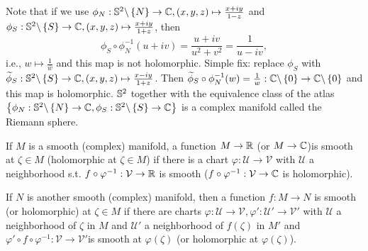 \begin{example}
\begin{enumerate}
  Note that if we use $\phi_N:\mathbb{S}^2 \backslash  \left\{N\right\} \to \mathbb{C},(x,y,z)\mapsto \frac{x+iy}{1-z}$ and $\phi_S:\mathbb{S}^2\backslash \left\{S\right\} \to \mathbb{C},(x,y,z)\mapsto \frac{x+iy}{1+z}$, then
  \[
    \phi_S\circ \phi_N^{-1}(u+iv)= \frac{u+iv}{u^2+v^2}=\frac{1}{u-iv},
  \] 
  i.e., $w\mapsto \frac{1}{\overline{w} }$ and this map is not holomorphic. Simple fix: replace $\phi_S$ with $\widetilde{\phi}_S:\mathbb{S}^2 \backslash \left\{S\right\} \to \mathbb{C}, (x,y,z)\mapsto \frac{x-iy}{1+z}$. Then $\widetilde{\phi}_S\circ \phi^{-1}_N(w)=\frac{1}{w}:\mathbb{C} \backslash \left\{0\right\} \to \mathbb{C}\backslash \left\{0\right\} $ and this map is holomorphic. $\mathbb{S}^2$ together with the equivalence class of the atlas $\left\{\phi_N:\mathbb{S}^2\backslash \left\{N\right\} \to \mathbb{C},\phi_S:\mathbb{S}^2\backslash \left\{S\right\} \to \mathbb{C}\right\} $ is a complex manifold called the Riemann sphere.
\end{enumerate}
\end{example}

\begin{definition}
  If $M$ is a smooth (complex) manifold, a function $M\to \mathbb{R}$ (or $M\to \mathbb{C}$)is smooth at $\zeta \in M$ (holomorphic at $\zeta \in M$) if there is a chart $\varphi:\mathcal{U}\to \mathcal{V}$ with $\mathcal{U}$ a neighborhood s.t. $f\circ \varphi^{-1}:\mathcal{V}\to \mathbb{R}$ is smooth ($f\circ \varphi^{-1}:\mathcal{V}\to \mathbb{C}$ is holomorphic). 

  If $N$ is another smooth (complex) manifold, then a function $f:M\to N$ is smooth (or holomorphic) at $\zeta \in M$ if there are charts $\varphi:\mathcal{U}\to \mathcal{V},\varphi':\mathcal{U}'\to \mathcal{V}'$ with $\mathcal{U}$ a neighborhood of $\zeta$ in $M$ and $\mathcal{U'}$ a neighborhood of $f(\zeta)$ in $M'$ and $\varphi'\circ f\circ \varphi^{-1}:\mathcal{V}\to \mathcal{V}'$is smooth at $\varphi(\zeta)$ (or holomorphic at $\varphi(\zeta)$).
\end{definition}


